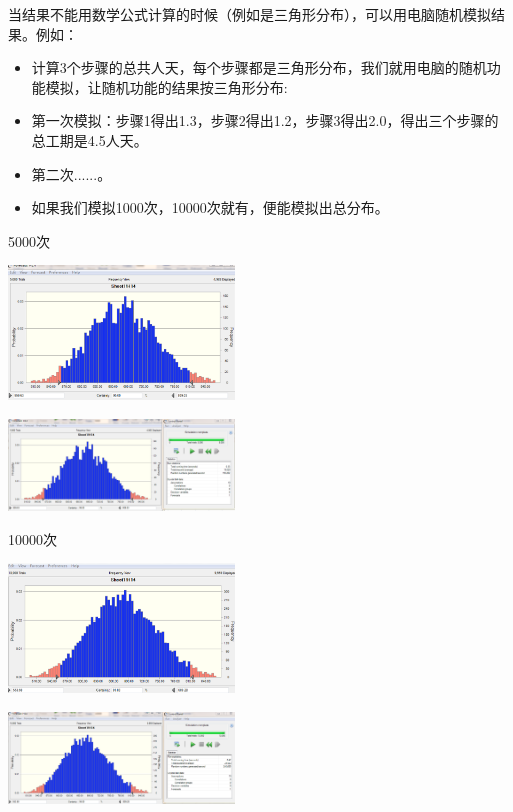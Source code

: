 当结果不能用数学公式计算的时候（例如是三角形分布），可以用电脑随机模拟结果。例如：

\begin{itemize}
\tightlist
\item
  计算3个步骤的总共人天，每个步骤都是三角形分布，我们就用电脑的随机功能模拟，让随机功能的结果按三角形分布:
\item
  第一次模拟：步骤1得出1.3，步骤2得出1.2，步骤3得出2.0，得出三个步骤的总工期是4.5人天。
\item
  第二次......。
\item
  如果我们模拟1000次，10000次就有，便能模拟出总分布。
\end{itemize}

5000次



\includegraphics[width=6cm]{捕获2-1.PNG}

\includegraphics[width=6cm]{捕获2.PNG}

10000次



\includegraphics[width=6cm]{捕获1-1.PNG}

\includegraphics[width=6cm]{捕获1.PNG}


